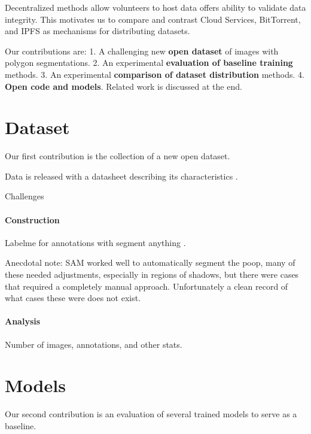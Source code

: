 \documentclass[10pt,twocolumn,letterpaper]{article}
\begin{document}
Decentralized methods allow volunteers to host data offers ability to validate
data integrity. This motivates us to compare and contrast Cloud Services,
BitTorrent, and IPFS as mechanisms for distributing datasets.

Our contributions are:
1. A challenging new \textbf{open dataset} of images with polygon segmentations.
2. An experimental \textbf{evaluation of baseline training} methods.
3. An experimental \textbf{comparison of dataset distribution} methods.
4. \textbf{Open code and models}.
Related work is discussed at the end.



\section{Dataset}

Our first contribution is the collection of a new open dataset.


Data is released with a datasheet describing its characteristics \cite{gebru_datasheets_2021}.

Challenges

\paragraph{Construction}

Labelme \cite{wada_labelmeailabelme_nodate} for annotations with segment anything \cite{kirillov_segment_2023}.

Anecdotal note: SAM worked well to automatically segment the poop, many of
these needed adjustments, especially in regions of shadows, but there were
cases that required a completely manual approach. Unfortunately a clean record
of what cases these were does not exist. 

\paragraph{Analysis}

Number of images, annotations, and other stats.


\section{Models}

Our second contribution is an evaluation of several trained models to serve as
a baseline.
\end{document}
